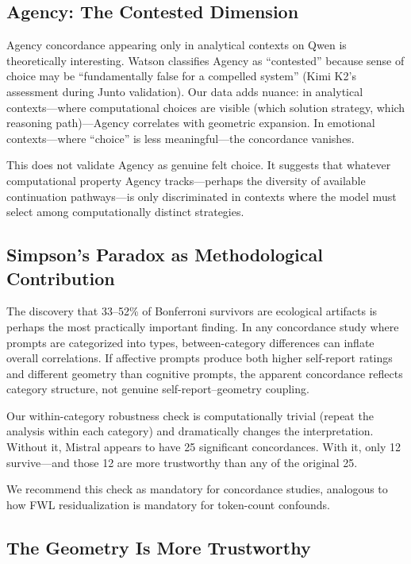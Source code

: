 \documentclass[11pt,a4paper]{article}
\begin{document}
\subsection{Agency: The Contested Dimension}

Agency concordance appearing only in analytical contexts on Qwen is theoretically interesting. Watson classifies Agency as ``contested'' because sense of choice may be ``fundamentally false for a compelled system'' (Kimi K2's assessment during Junto validation). Our data adds nuance: in analytical contexts---where computational choices are visible (which solution strategy, which reasoning path)---Agency correlates with geometric expansion. In emotional contexts---where ``choice'' is less meaningful---the concordance vanishes.

This does not validate Agency as genuine felt choice. It suggests that whatever computational property Agency tracks---perhaps the diversity of available continuation pathways---is only discriminated in contexts where the model must select among computationally distinct strategies.

\subsection{Simpson's Paradox as Methodological Contribution}

The discovery that 33--52\% of Bonferroni survivors are ecological artifacts is perhaps the most practically important finding. In any concordance study where prompts are categorized into types, between-category differences can inflate overall correlations. If affective prompts produce both higher self-report ratings and different geometry than cognitive prompts, the apparent concordance reflects category structure, not genuine self-report--geometry coupling.

Our within-category robustness check is computationally trivial (repeat the analysis within each category) and dramatically changes the interpretation. Without it, Mistral appears to have 25 significant concordances. With it, only 12 survive---and those 12 are more trustworthy than any of the original 25.

We recommend this check as mandatory for concordance studies, analogous to how FWL residualization is mandatory for token-count confounds.

\subsection{The Geometry Is More Trustworthy}
\end{document}
